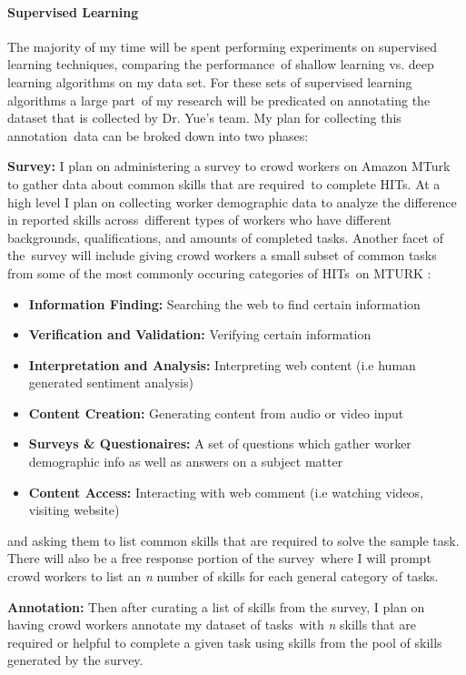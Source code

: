 \documentclass[letterpaper,12pt]{article}
\begin{document}
\paragraph{Supervised Learning}
The majority of my time will be spent performing experiments on supervised learning techniques, comparing the performance\
of shallow learning vs. deep learning algorithms on my data set. For these sets of supervised learning algorithms a large part\
of my research will be predicated on annotating the dataset that is collected by Dr. Yue's team. My plan for collecting this annotation\
data can be broked down into two phases:


\textbf{Survey:} I plan on administering a survey to crowd workers on Amazon MTurk to gather data about common skills that are required\
to complete HITs. At a high level I plan on collecting worker demographic data to analyze the difference in reported skills across\
different types of workers who have different backgrounds, qualifications, and amounts of completed tasks. Another facet of the\
survey will include giving crowd workers a small subset of common tasks from some of the most commonly occuring categories of HITs\
on MTURK \cite{difallah2015dynamics}:
\begin{itemize}
	\item \textbf{Information Finding:} Searching the web to find certain information
	\item \textbf{Verification and Validation:} Verifying certain information
	\item \textbf{Interpretation and Analysis:} Interpreting web content (i.e human generated sentiment analysis)
	\item \textbf{Content Creation: } Generating content from audio or video input
	\item \textbf{Surveys \& Questionaires:} A set of questions which gather worker demographic info as well as answers on a subject matter
	\item \textbf{Content Access:} Interacting with web comment (i.e watching videos, visiting website)
\end{itemize}

and asking them to list common skills that are required to solve the sample task. There will also be a free response portion of the survey\
where I will prompt crowd workers to list an \emph{n} number of skills for each general category of tasks.

\textbf{Annotation:} Then after curating a list of skills from the survey, I plan on having crowd workers annotate my dataset of tasks\
with \emph{n} skills that are required or helpful to complete a given task using skills from the pool of skills generated by the survey.
\end{document}

